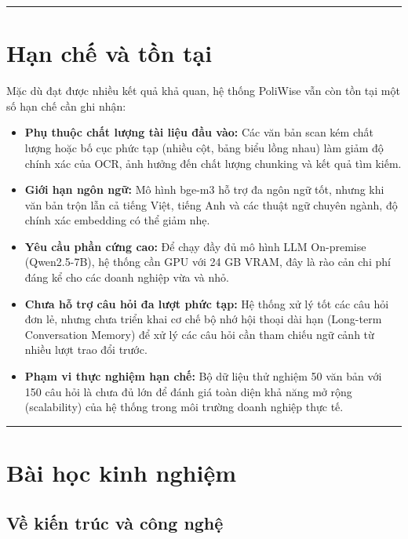 \documentclass[12pt,a4paper]{report}
\begin{document}
\rule{\textwidth}{0.5pt}

\section{Hạn chế và tồn tại}

Mặc dù đạt được nhiều kết quả khả quan, hệ thống PoliWise vẫn còn tồn tại một số hạn chế cần ghi nhận:

\begin{itemize}
    \item \textbf{Phụ thuộc chất lượng tài liệu đầu vào:} Các văn bản scan kém chất lượng hoặc bố cục phức tạp (nhiều cột, bảng biểu lồng nhau) làm giảm độ chính xác của OCR, ảnh hưởng đến chất lượng chunking và kết quả tìm kiếm.
    \item \textbf{Giới hạn ngôn ngữ:} Mô hình bge-m3 hỗ trợ đa ngôn ngữ tốt, nhưng khi văn bản trộn lẫn cả tiếng Việt, tiếng Anh và các thuật ngữ chuyên ngành, độ chính xác embedding có thể giảm nhẹ.
    \item \textbf{Yêu cầu phần cứng cao:} Để chạy đầy đủ mô hình LLM On-premise (Qwen2.5-7B), hệ thống cần GPU với 24 GB VRAM, đây là rào cản chi phí đáng kể cho các doanh nghiệp vừa và nhỏ.
    \item \textbf{Chưa hỗ trợ câu hỏi đa lượt phức tạp:} Hệ thống xử lý tốt các câu hỏi đơn lẻ, nhưng chưa triển khai cơ chế bộ nhớ hội thoại dài hạn (Long-term Conversation Memory) để xử lý các câu hỏi cần tham chiếu ngữ cảnh từ nhiều lượt trao đổi trước.
    \item \textbf{Phạm vi thực nghiệm hạn chế:} Bộ dữ liệu thử nghiệm 50 văn bản với 150 câu hỏi là chưa đủ lớn để đánh giá toàn diện khả năng mở rộng (scalability) của hệ thống trong môi trường doanh nghiệp thực tế.
\end{itemize}

\rule{\textwidth}{0.5pt}

\section{Bài học kinh nghiệm}

\subsection{Về kiến trúc và công nghệ}
\end{document}
